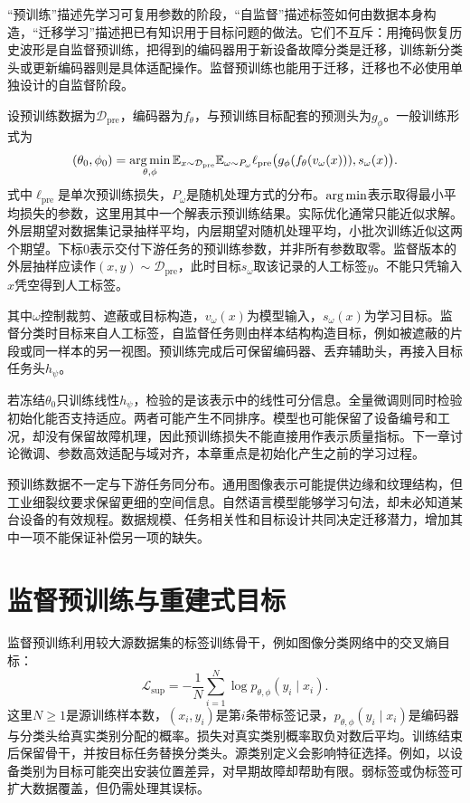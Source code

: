 “预训练”描述先学习可复用参数的阶段，“自监督”描述标签如何由数据本身构造，“迁移学习”描述把已有知识用于目标问题的做法。它们不互斥：用掩码恢复历史波形是自监督预训练，把得到的编码器用于新设备故障分类是迁移，训练新分类头或更新编码器则是具体适配操作。监督预训练也能用于迁移，迁移也不必使用单独设计的自监督阶段。

设预训练数据为$\mathcal D_{\mathrm{pre}}$，编码器为$f_\theta$，与预训练目标配套的预测头为$g_\phi$。一般训练形式为
\begin{equation}
 (\theta_0,\phi_0)=\mathop{\mathrm{arg\,min}}_{\theta,\phi}
 \mathbb{E}_{x\sim\mathcal D_{\mathrm{pre}}}
 \mathbb{E}_{\omega\sim P_\omega}
 \ell_{\mathrm{pre}}\bigl(g_\phi(f_\theta(v_\omega(x))),s_\omega(x)\bigr).
\end{equation}
式中$\ell_{\mathrm{pre}}$是单次预训练损失，$P_\omega$是随机处理方式的分布。$\mathop{\mathrm{arg\,min}}$表示取得最小平均损失的参数，这里用其中一个解表示预训练结果。实际优化通常只能近似求解。外层期望对数据集记录抽样平均，内层期望对随机处理平均，小批次训练近似这两个期望。下标$0$表示交付下游任务的预训练参数，并非所有参数取零。监督版本的外层抽样应读作$(x,y)\sim\mathcal D_{\mathrm{pre}}$，此时目标$s_\omega$取该记录的人工标签$y$。不能只凭输入$x$凭空得到人工标签。

其中$\omega$控制裁剪、遮蔽或目标构造，$v_\omega(x)$为模型输入，$s_\omega(x)$为学习目标。监督分类时目标来自人工标签，自监督任务则由样本结构构造目标，例如被遮蔽的片段或同一样本的另一视图。预训练完成后可保留编码器、丢弃辅助头，再接入目标任务头$h_\psi$。

若冻结$\theta_0$只训练线性$h_\psi$，检验的是该表示中的线性可分信息。全量微调则同时检验初始化能否支持适应。两者可能产生不同排序。模型也可能保留了设备编号和工况，却没有保留故障机理，因此预训练损失不能直接用作表示质量指标。下一章讨论微调、参数高效适配与域对齐，本章重点是初始化产生之前的学习过程。

预训练数据不一定与下游任务同分布。通用图像表示可能提供边缘和纹理结构，但工业细裂纹要求保留更细的空间信息。自然语言模型能够学习句法，却未必知道某台设备的有效规程。数据规模、任务相关性和目标设计共同决定迁移潜力，增加其中一项不能保证补偿另一项的缺失。

\section{监督预训练与重建式目标}
监督预训练利用较大源数据集的标签训练骨干，例如图像分类网络中的交叉熵目标\cite{he2016resnet}：
\begin{equation}
 \mathcal L_{\mathrm{sup}}=-\frac1N\sum_{i=1}^{N}
 \log p_{\theta,\phi}(y_i\mid x_i).
\end{equation}
这里$N\geq1$是源训练样本数，$(x_i,y_i)$是第$i$条带标签记录，$p_{\theta,\phi}(y_i\mid x_i)$是编码器与分类头给真实类别分配的概率。损失对真实类别概率取负对数后平均。训练结束后保留骨干，并按目标任务替换分类头。源类别定义会影响特征选择。例如，以设备类别为目标可能突出安装位置差异，对早期故障却帮助有限。弱标签或伪标签可扩大数据覆盖，但仍需处理其误标。

